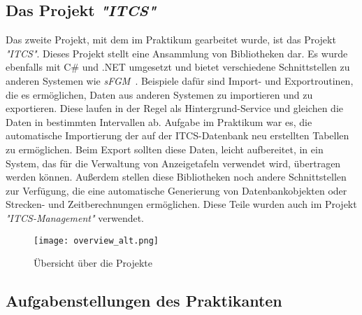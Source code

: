 \subsection{Das Projekt \emph{"ITCS"}}\label{sec:itcs}
    Das zweite Projekt, mit dem im Praktikum gearbeitet wurde, ist das Projekt \emph{"ITCS"}. Dieses Projekt stellt eine Ansammlung von Bibliotheken dar.
    Es wurde ebenfalls mit C\# und .NET umgesetzt und bietet verschiedene Schnittstellen zu anderen Systemen wie \emph{sFGM}~\cite{sFGM}.
    Beispiele dafür sind Import- und Exportroutinen, die es ermöglichen, Daten aus anderen Systemen zu importieren und zu exportieren. Diese laufen in der Regel als Hintergrund-Service und gleichen die Daten in
    bestimmten Intervallen ab. Aufgabe im Praktikum war es, die automatische 
    Importierung der auf der ITCS-Datenbank neu erstellten Tabellen zu ermöglichen. Beim Export sollten diese Daten, leicht aufbereitet, in ein System, das für die Verwaltung von 
    Anzeigetafeln verwendet wird, übertragen werden können. Außerdem stellen diese Bibliotheken noch andere Schnittstellen zur Verfügung, die eine automatische Generierung
    von Datenbankobjekten oder Strecken- und Zeitberechnungen ermöglichen. Diese Teile wurden auch im Projekt \emph{"ITCS-Management"} verwendet.
    \begin{figure}[H]
        \centering
        \texttt{[image: overview\_alt.png]}
        \caption{Übersicht über die Projekte}
        \label{fig:VTs}
    \end{figure}

\subsection{Aufgabenstellungen des Praktikanten}\label{sec:aufgabenstellung-praktikant}

